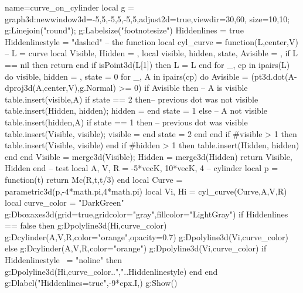 \documentclass[12pt]{standalone}
\begin{document}
\begin{luadraw}{name=curve_on_cylinder}
local g = graph3d:new{window3d={-5,5,-5,5,-5,5},adjust2d=true,viewdir={30,60}, size={10,10}};
g:Linejoin("round"); g:Labelsize("footnotesize")
Hiddenlines = true
Hiddenlinestyle = "dashed"
-- the function
local cyl_curve = function(L,center,V) -- L = curve
    local Visible, Hidden = {},{}
    local visible, hidden, state, Avisible = {}, {}
    if L == nil then return end
    if isPoint3d(L[1]) then L = {L} end
    for _, cp in ipairs(L) do
        visible, hidden = {}, {}
        state = 0
        for _, A in ipairs(cp) do
            Avisible = (pt3d.dot(A-dproj3d(A,{center,V}),g.Normal) >= 0)
            if Avisible then -- A is visible
                table.insert(visible,A)
                if state == 2 then-- previous dot was not visible
                    table.insert(Hidden, hidden); hidden = {}
                end
                state = 1
            else -- A not visible
                table.insert(hidden,A)
                if state == 1 then -- previous dot was visible
                    table.insert(Visible, visible); visible = {}
                end
                state = 2
            end
        end
        if #visible > 1 then table.insert(Visible, visible) end
        if #hidden > 1 then  table.insert(Hidden, hidden) end
    end
    Visible = merge3d(Visible); Hidden = merge3d(Hidden)
    return Visible, Hidden
end
-- test
local A, V, R = -5*vecK, 10*vecK, 4 -- cylinder
local p = function(t) return Mc(R,t,t/3) end
local Curve = parametric3d(p,-4*math.pi,4*math.pi)
local Vi, Hi = cyl_curve(Curve,A,V,R)
local curve_color = "DarkGreen"
g:Dboxaxes3d({grid=true,gridcolor="gray",fillcolor="LightGray"})
if Hiddenlines == false then
    g:Dpolyline3d(Hi,curve_color)
    g:Dcylinder(A,V,R,{color="orange",opacity=0.7})
    g:Dpolyline3d(Vi,curve_color)
else
    g:Dcylinder(A,V,R,{color="orange"})
    g:Dpolyline3d(Vi,curve_color)
    if Hiddenlinestyle ~= "noline" then 
        g:Dpolyline3d(Hi,curve_color..","..Hiddenlinestyle)
    end
end
g:Dlabel("Hiddenlines=true",-9*cpx.I,{})
g:Show()
\end{luadraw}
\end{document}
